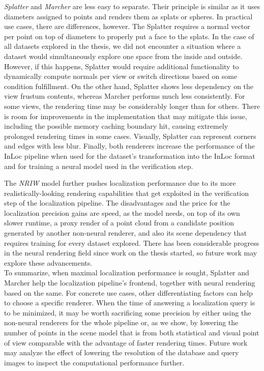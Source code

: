 \emph{Splatter} and \emph{Marcher} are less easy to separate. Their principle
is similar as it uses diameters assigned to points and renders them as splats or
spheres. In practical use cases, there are differences, however.
The Splatter requires a normal vector per point on top of diameters to
properly put a face to the splats. In the case of all datasets explored in the
thesis, we did not encounter a situation where a dataset would simultaneously
explore one space from the inside and outside. However, if this happens, Splatter
would require additional functionality to dynamically compute normals per view
or switch directions based on some condition fulfillment. On the other hand,
Splatter shows less dependency on the view frustum contents, whereas Marcher
performs much less consistently. For some views, the rendering time may be
considerably longer than for others. There is room for improvements in the
implementation that may mitigate this issue, including the possible memory caching
boundary hit, causing extremely prolonged rendering times in some cases. Visually,
Splatter can represent corners and edges with less blur. Finally, both
renderers increase the performance of the InLoc pipeline when used for the
dataset's transformation into the InLoc format and for training a neural model
used in the verification step.

The \emph{NRIW} model further pushes localization performance due to its more
realistically-looking rendering capabilities that get exploited in the verification
step of the localization pipeline. The disadvantages and the price for the localization
precision gains are speed, as the model needs, on top of its own slower runtime,
a proxy render of a point cloud from a candidate position generated by another
non-neural renderer, and also its scene dependency that requires training for
every dataset explored. There has been considerable progress in the neural rendering
field since work on the thesis started, so future work may explore these advancements.\\

To summarize, when maximal localization performance is sought, Splatter and Marcher
help the localization pipeline's frontend, together with neural rendering based on the
same. For concrete use cases, other differentiating factors can help to choose a specific
renderer. When the time of answering a localization query is to be minimized, it may be
worth sacrificing some precision by either using the non-neural renderers for the whole
pipeline or, as we show, by lowering the number of points in the scene model that is from
both statistical and visual point of view comparable with the advantage of faster
rendering times. Future work may analyze the effect of lowering the resolution of the
database and query images to inspect the computational performance further.

